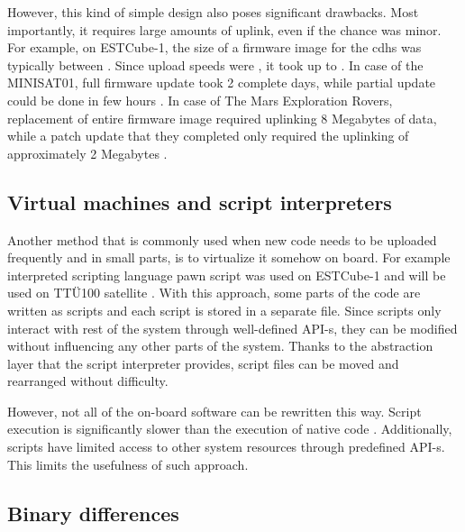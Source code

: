 However, this kind of simple design also poses significant drawbacks. Most importantly, it requires large amounts of uplink, even if the chance was minor. For example, on ESTCube-1, the size of a firmware image for the \gls{cdhs} was typically between . Since upload speeds were , it took up to . In case of the MINISAT01, full firmware update took 2 complete days, while partial update could be done in few hours \cite{Garrido1998}. In case of The Mars Exploration Rovers, replacement of entire firmware image required uplinking 8 Megabytes of data, while a patch update that they completed only required the uplinking of approximately 2 Megabytes \cite{Greco2005}. 

\subsection{Virtual machines and script interpreters}

Another method that is commonly used when new code needs to be uploaded frequently and in small parts, is to virtualize it somehow on board. For example interpreted scripting language pawn script was used on ESTCube-1 \cite{Suenter2016} and will be used on TTÜ100 satellite \cite{Aasavaeli2017}. With this approach, some parts of the code are written as scripts and each script is stored in a separate file. Since scripts only interact with rest of the system through well-defined API-s, they can be modified without influencing any other parts of the system. Thanks to the abstraction layer that the script interpreter provides, script files can be moved and rearranged without difficulty. 

However, not all of the on-board software can be rewritten this way. Script execution is significantly slower than the execution of native code . Additionally, scripts have limited access to other system resources through predefined API-s. This limits the usefulness of such approach.


\subsection{Binary differences}

